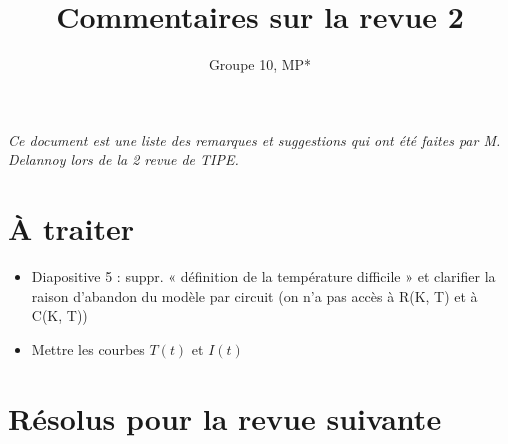 \documentclass{article}
\title{Commentaires sur la revue 2}
\author{Groupe 10, MP*}
\newcommand{\fleche}{$\Rightarrow {}$}
\begin{document}
\maketitle

\textit{Ce document est une liste des remarques et suggestions qui ont été faites par M. Delannoy lors de la 2 revue de TIPE.}

\vspace{1cm}

\section*{À traiter}

\begin{itemize}
    \item Diapositive 5 : suppr. « définition de la température difficile » et clarifier la raison d'abandon du modèle par circuit (on n'a pas accès à R(K, T) et à C(K, T))
    \item Mettre les courbes $T(t)$ et $I(t)$
\end{itemize}

\section*{Résolus pour la revue suivante}
\end{document}
